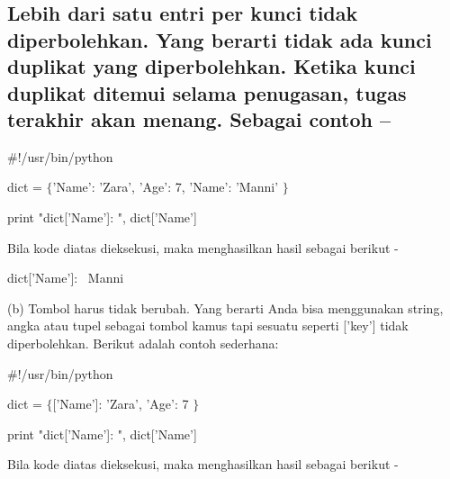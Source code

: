\subsection*{Lebih dari satu entri per kunci tidak diperbolehkan. Yang berarti tidak ada kunci duplikat yang diperbolehkan. Ketika kunci duplikat ditemui selama penugasan, tugas terakhir akan menang. Sebagai contoh –}
 \par
\vspace{12pt}
\noindent 
 \hspace*{0.5in}  $  \#  $!/usr/bin/python \par
\vspace{12pt}
\noindent 
 \hspace*{0.5in} dict =  $  \{  $'Name': 'Zara', 'Age': 7, 'Name': 'Manni' $  \}  $ \par
\vspace{12pt}
\noindent 
 \hspace*{0.5in} print "dict['Name']: ", dict['Name'] \par
\begin{adjustwidth}{0.03in}{0.03in}
Bila kode diatas dieksekusi, maka menghasilkan hasil sebagai berikut -\end{adjustwidth}
 \par
\noindent 
{\fontsize{9pt}{9pt}\selectfont  \hspace*{0.5in} dict['Name']:~ Manni} \par
\vspace{12pt}
\begin{adjustwidth}{0.03in}{0.03in}
(b) Tombol harus tidak berubah. Yang berarti Anda bisa menggunakan string, angka atau tupel sebagai tombol kamus tapi sesuatu seperti ['key'] tidak diperbolehkan. Berikut adalah contoh sederhana:\end{adjustwidth}
 \par
\vspace{12pt}
\noindent 
 \hspace*{0.5in}  $  \#  $!/usr/bin/python \par
\vspace{12pt}
\noindent 
 \hspace*{0.5in} dict =  $  \{  $['Name']: 'Zara', 'Age': 7 $  \}  $ \par
\vspace{12pt}
\noindent 
 \hspace*{0.5in} print "dict['Name']: ", dict['Name'] \par
\begin{adjustwidth}{0.03in}{0.03in}
Bila kode diatas dieksekusi, maka menghasilkan hasil sebagai berikut -\end{adjustwidth}
